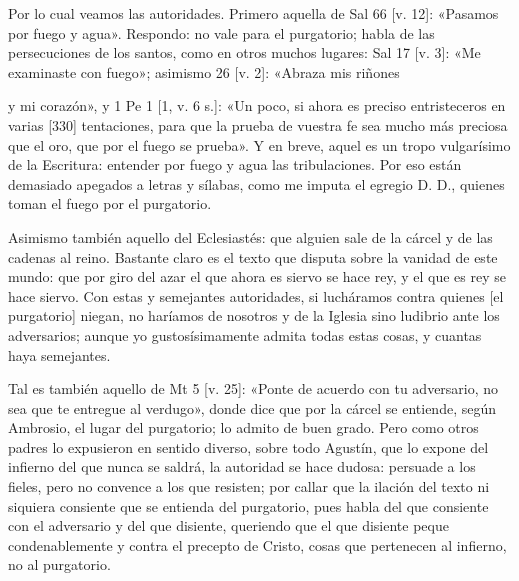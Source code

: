 Por lo cual veamos las autoridades. Primero aquella de Sal 66 [v. 12]: «Pasamos por fuego y agua». Respondo: no vale para el purgatorio; habla de las persecuciones de los santos, como en otros muchos lugares: Sal 17 [v. 3]: «Me examinaste con fuego»; asimismo 26 [v. 2]: «Abraza mis riñones

y mi corazón», y 1 Pe 1 [1, v. 6 s.]: «Un poco, si ahora es preciso entristeceros en varias [330] tentaciones, para que la prueba de vuestra fe sea mucho más preciosa que el oro, que por el fuego se prueba». Y en breve, aquel es un tropo vulgarísimo de la Escritura: entender por fuego y agua las tribulaciones. Por eso están demasiado apegados a letras y sílabas, como me imputa el egregio D. D., quienes toman el fuego por el purgatorio.

Asimismo también aquello del Eclesiastés: que alguien sale de la cárcel y de las cadenas al reino. Bastante claro es el texto que disputa sobre la vanidad de este mundo: que por giro del azar el que ahora es siervo se hace rey, y el que es rey se hace siervo. Con estas y semejantes autoridades, si lucháramos contra quienes [el purgatorio] niegan, no haríamos de nosotros y de la Iglesia sino ludibrio ante los adversarios; aunque yo gustosísimamente admita todas estas cosas, y cuantas haya semejantes.

Tal es también aquello de Mt 5 [v. 25]: «Ponte de acuerdo con tu adversario, no sea que te entregue al verdugo», donde dice que por la cárcel se entiende, según Ambrosio, el lugar del purgatorio; lo admito de buen grado. Pero como otros padres lo expusieron en sentido diverso, sobre todo Agustín, que lo expone del infierno del que nunca se saldrá, la autoridad se hace dudosa: persuade a los fieles, pero no convence a los que resisten; por callar que la ilación del texto ni siquiera consiente que se entienda del purgatorio, pues habla del que consiente con el adversario y del que disiente, queriendo que el que disiente peque condenablemente y contra el precepto de Cristo, cosas que pertenecen al infierno, no al purgatorio.

